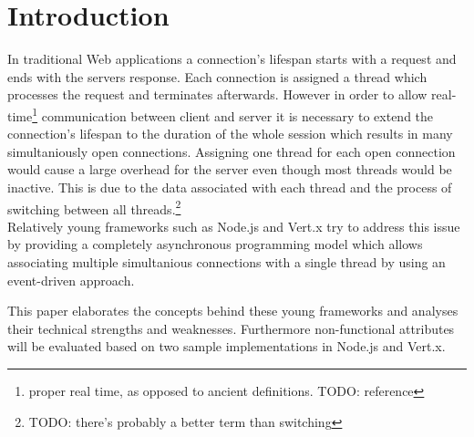 

\title{\papertitle}
\author{Rocco Schulz, Max Vökler, Joe Boden,\\ Robert Wawrzyniak, Can Paul Bineytioglu\\\\
	Corporate State University\\Baden-Wuerttemberg - Stuttgart}

\date{\today}



\maketitle


\begin{abstract}
This paper evaluates asynchronous server technologies. Strenghts and weaknesses
of asynchronous programming models are elaborated and a proof of concept 
based on node.js and vert.x is used to evaluate non-functional attributes such as
maintainability. \ldots
\end{abstract}

\section{Introduction}
In traditional Web applications a connection's lifespan starts with a request and
ends with the servers response. Each connection is assigned a thread which
processes the request and terminates afterwards.
However in order to allow real-time\footnote{proper real time, as opposed to
ancient definitions. TODO: reference} communication between client and server it
is necessary to extend the connection's lifespan to the duration of the whole
session which results in many simultaniously open connections.
Assigning one thread for each open connection would cause a large overhead for
the server even though most threads would be inactive. This is due to the data
associated with each thread and the process of switching between all
threads.\footnote{TODO: there's probably a better term than switching}\\
Relatively young frameworks such as Node.js and Vert.x try to address this issue 
by providing a completely asynchronous programming model which allows associating
multiple simultanious connections with a single thread by using an event-driven approach.

This paper elaborates the concepts behind these young frameworks and analyses their 
technical strengths and weaknesses. Furthermore non-functional attributes will be
evaluated based on two sample implementations in Node.js  and Vert.x.

